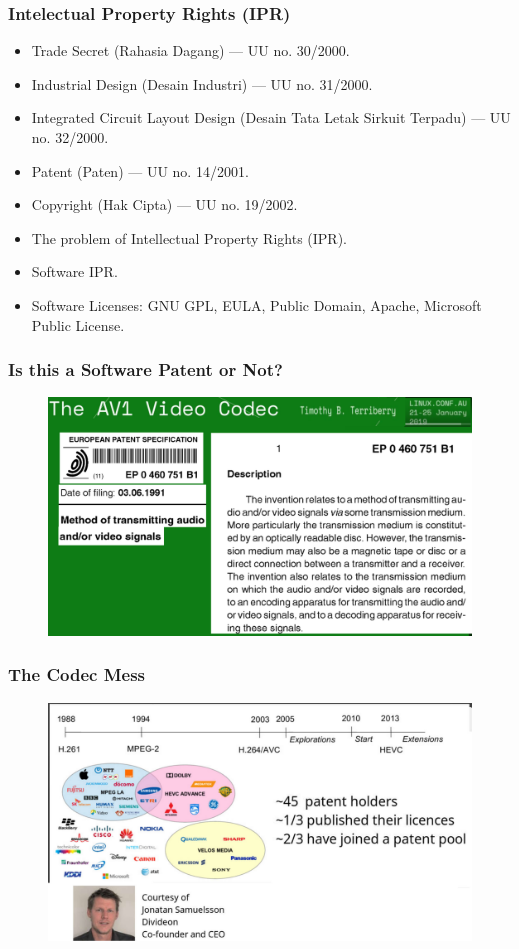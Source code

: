 \documentclass[xcolor=table, notheorems, hyperref={pdfpagelabels=false}]{beamer}
\begin{document}
\begin{frame}
\frametitle{Intelectual Property Rights (IPR)}
\begin{itemize}
\item Trade Secret (Rahasia Dagang) --- UU no. 30/2000.
\item Industrial Design (Desain Industri) --- UU no. 31/2000.
\item Integrated Circuit Layout Design (Desain Tata Letak Sirkuit Terpadu) --- UU no. 32/2000.
\item Patent (Paten) --- UU no. 14/2001.
\item Copyright (Hak Cipta) --- UU no. 19/2002.
\item The problem of Intellectual Property Rights (IPR).
\item Software IPR.
\item Software Licenses: GNU GPL, EULA, Public Domain, Apache, Microsoft Public License.
\end{itemize}
\end{frame}

\begin{frame}
\frametitle{Is this a Software Patent or Not?}
\begin{figure}
\includegraphics[width=0.9\linewidth]{os01-avw}
\end{figure}
\end{frame}

\begin{frame}
\frametitle{The Codec Mess}
\begin{figure}
\includegraphics[width=0.99\linewidth]{os01-avx}
\end{figure}
\end{frame}
\end{document}
